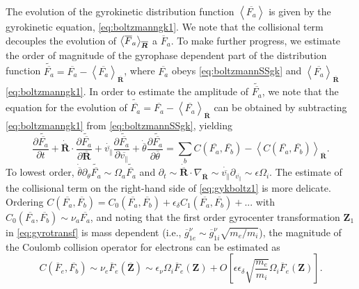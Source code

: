 The evolution of the gyrokinetic distribution function $\left<\overline{F_a}\right>$ is given by the gyrokinetic equation, \cref{eq:boltzmanngk1}.
%
We note that the collisional term decouples the evolution of $\left<\overline F_a\right>_{\overline{\bm{R}}}$ a $\overline F_a$.
%
To make further progress, we estimate the order of magnitude of the gyrophase dependent part of the distribution function $\widetilde{\overline{F_a}} =\overline{F_a} - \left< \overline{F_a} \right>_{\overline{\mathbf{R}}}$, where $\overline{F_a}$ obeys \cref{eq:boltzmannSSgk} and $\left< \overline{F_a} \right>_{\overline{\mathbf{R}}}$ \cref{eq:boltzmanngk1}.
%
In order to estimate the amplitude of $\widetilde{\overline{F_a}}$, we note that the equation for the evolution of $\widetilde{\overline{ F_a}}=\overline{F_a}-\left< \overline{F_a} \right>_{\overline{\mathbf{R}}}$ can be obtained by subtracting \cref{eq:boltzmanngk1} from \cref{eq:boltzmannSSgk}, yielding
%
\begin{equation}
    \frac{\partial \widetilde{\overline{ F_a}}}{\partial t} + \dot{\overline {\mathbf R}} \cdot \frac{\partial \widetilde{\overline{ F_a}}}{\partial \overline {\mathbf R}} +\dot{\overline {v_\parallel}} \frac{\partial \widetilde{\overline{ F_a}}}{\partial \overline {v_\parallel}}+\dot{\overline {\theta}} \frac{\partial \widetilde{\overline{ F_a}}}{\partial \overline {\theta}} = \sum_b C(\overline{F_a},\overline{F_b})-\left<C(\overline{F_a},\overline{F_b})\right>_{\overline{\mathbf{R}}}.
\label{eq:gykboltz1}
\end{equation}
%
To lowest order, $\dot{\overline {\theta}} \partial_\theta \widetilde{\overline{F_a}} \sim \Omega_a \widetilde{\overline{F_a}} $ and $\partial_t \sim \dot{\overline {\mathbf R}} \cdot \nabla_{ \overline {\mathbf R}}\sim \dot{\overline{v_\parallel}}\partial_{{\overline{v_\parallel}}}\sim \epsilon \Omega_i$.
%
The estimate of the collisional term on the right-hand side of \cref{eq:gykboltz1} is more delicate.
%
Ordering $C(\overline{F_a},\overline{F_b}) = C_0(\overline{F_a},\overline{F_b}) + \epsilon_\delta C_1(\overline{F_a},\overline{F_b})+...$ with $C_0(\overline{F_a},\overline{F_b}) \sim \nu_a \overline{F_a}$, and noting that the first order gyrocenter transformation $\mathbf Z_1$ in \cref{eq:gyrotransf} is mass dependent (i.e., $\overline{g}_{1e}^\nu \sim  \overline{g}_{1i}^\nu\sqrt{m_e/m_i}$), the magnitude of the Coulomb collision operator for electrons can be estimated as
%
\begin{equation}
    C(\overline F_e,\overline{F_b}) \sim \nu_e \overline F_e(\overline{\mathbf Z}) \sim \epsilon_\nu \Omega_i \overline F_e(\mathbf Z)+O\left[\epsilon \epsilon_\delta \sqrt{\frac{m_e}{m_i}}\Omega_i \overline F_e(\mathbf Z)\right].
\label{eq:orderingcfe}
\end{equation}
